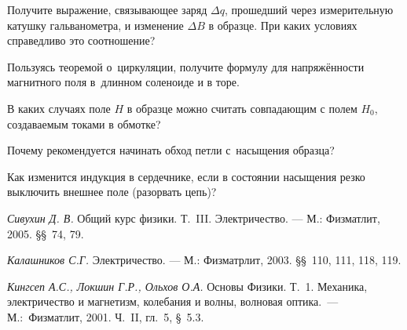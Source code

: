 \begin{lab:questions}

	\item Получите выражение, связывающее заряд $\Delta q$, прошедший через
    измерительную катушку гальванометра, и изменение $\Delta B$ в образце.
    При каких условиях справедливо это соотношение?

	\item Пользуясь теоремой о~циркуляции, получите формулу для напряжённости
магнитного поля в~длинном соленоиде и в торе.

    \item В каких случаях поле $H$ в образце можно считать совпадающим
    с полем $H_0$, создаваемым токами в обмотке?

    \item Почему рекомендуется начинать обход петли с~насыщения образца?

    \item Как изменится индукция в сердечнике, если в состоянии насыщения
    резко выключить внешнее поле (разорвать цепь)?
\end{lab:questions}

\begin{lab:literature}

	\item \emph{Сивухин Д. В.} Общий курс физики. Т.~III. Электричество. --- М.:
Физматлит, 2005. \S\S~74, 79.

	\item \emph{Калашников С.Г.} Электричество. --- М.: Физматрлит, 2003.
\S\S~110, 111, 118, 119.

	\item \emph{Кингсеп А.С., Локшин Г.Р., Ольхов О.А.} Основы Физики. Т.~1.
Механика, электричество и магнетизм, колебания и
	волны, волновая оптика.~--- М.:~Физматлит, 2001. Ч.~II, гл.~5, \S~5.3.

\end{lab:literature}
